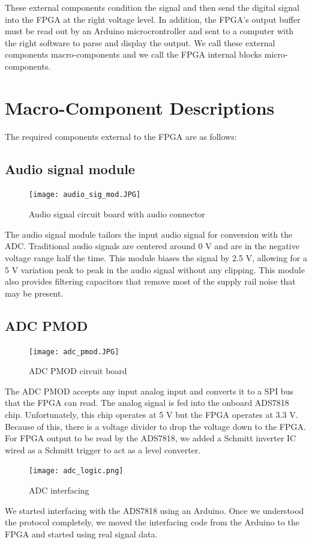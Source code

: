\documentclass[12pt]{article}
\begin{document}
    These external components condition the signal and then send the digital signal into the FPGA at the right voltage level. In addition, the FPGA's output buffer must be read out by an Arduino microcrontroller and sent to a computer with the right software to parse and display the output. We call these external components macro-components and we call the FPGA internal blocks micro-components.
  
  \section*{Macro-Component Descriptions}
    The required components external to the FPGA are as follows:
    \subsection*{Audio signal module}
      \begin{figure}[H]
        \centering
        \texttt{[image: audio\_sig\_mod.JPG]}
        \caption{Audio signal circuit board with audio connector}
        \label{overflow}
      \end{figure}
      The audio signal module tailors the input audio signal for conversion with the ADC. Traditional audio signals are centered around 0 V and are in the negative voltage range half the time. This module biases the signal by 2.5 V, allowing for a 5 V variation peak to peak in the audio signal without any clipping. This module also provides filtering capacitors that remove most of the supply rail noise that may be present.

    \subsection*{ADC PMOD}
      \begin{figure}[H]
        \centering
        \texttt{[image: adc\_pmod.JPG]}
        \caption{ADC PMOD circuit board}
        \label{overflow}
      \end{figure}
      The ADC PMOD accepts any input analog input and converts it to a SPI bus that the FPGA can read. The analog signal is fed into the onboard ADS7818 chip. Unfortunately, this chip operates at 5 V but the FPGA operates at 3.3 V. Because of this, there is a voltage divider to drop the voltage down to the FPGA. For FPGA output to be read by the ADS7818, we added a Schmitt inverter IC wired as a Schmitt trigger to act as a level converter.
      \begin{figure}[H]
        \centering
        \texttt{[image: adc\_logic.png]}
        \caption{ADC interfacing}
        \label{overflow}
      \end{figure}
      We started interfacing with the ADS7818 using an Arduino. Once we understood the protocol completely, we moved the interfacing code from the Arduino to the FPGA and started using real signal data.
\end{document}
